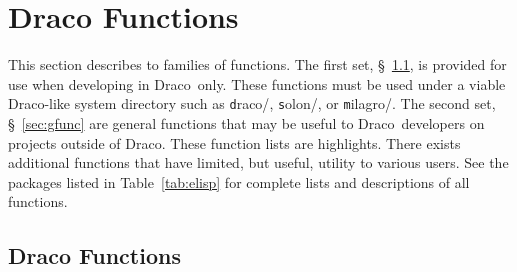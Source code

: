 \documentclass[11pt]{nmemo}
\newcommand{\comp}[1]{{\normalfont\texttt#1}}
\newcommand{\draco}{{\normalfont\sffamily Draco}}
\begin{document}

\section{Draco Functions}
\label{sec:func}

This section describes to families of functions.  The first set,
\S~\ref{sec:dfunc}, is provided for use when developing in \draco\ 
only.  These functions must be used under a viable \draco-like system
directory such as \comp{draco/}, \comp{solon/}, or \comp{milagro/}.
The second set, \S~\ref{sec:gfunc} are general functions that may be
useful to \draco\ developers on projects outside of \draco.  These
function lists are highlights.  There exists additional functions that 
have limited, but useful, utility to various users.  See the packages
listed in Table~\ref{tab:elisp} for complete lists and descriptions of 
all functions.  

\subsection{Draco Functions}
\label{sec:dfunc}
\end{document}

